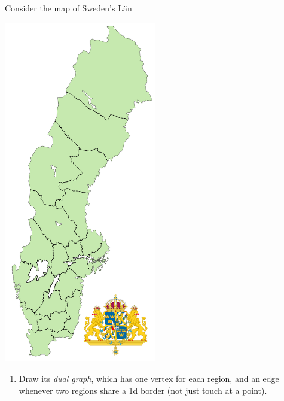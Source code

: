 \documentclass[11pt,fleqn]{book} %
\begin{document}
 \begin{problem}
Consider the map of Sweden's Län
\begin{center}
\includegraphics[height=15cm]{LanSverige.png}
\end{center}
\begin{enumerate}[label=\alph*.]
 \item Draw its \textit{dual graph}, which has one vertex for each region, and an edge whenever two regions share a 1d border (not just touch at a point).
\end{enumerate}
 \end{problem}
\end{document}
